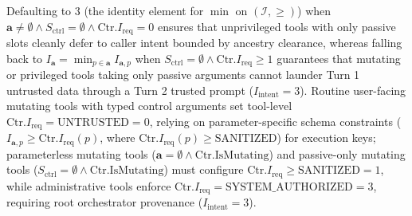 \documentclass[conference,10pt]{IEEEtran}
\begin{document}
Defaulting to $3$ (the identity element for $\min$ on $(\mathcal{I}, \ge)$) when $\mathbf{a} \ne \emptyset \land S_{\text{ctrl}} = \emptyset \land \text{Ctr}.I_{\text{req}} = 0$ ensures that unprivileged tools with only passive slots cleanly defer to caller intent bounded by ancestry clearance, whereas falling back to $I_{\mathbf{a}} = \min_{p \in \mathbf{a}} I_{\mathbf{a}, p}$ when $S_{\text{ctrl}} = \emptyset \land \text{Ctr}.I_{\text{req}} \ge 1$ guarantees that mutating or privileged tools taking only passive arguments cannot launder Turn 1 untrusted data through a Turn 2 trusted prompt ($I_{\text{intent}} = 3$). Routine user-facing mutating tools with typed control arguments set tool-level $\text{Ctr}.I_{\text{req}} = \text{UNTRUSTED} = 0$, relying on parameter-specific schema constraints ($I_{\mathbf{a}, p} \ge \text{Ctr}.I_{\text{req}}(p)$, where $\text{Ctr}.I_{\text{req}}(p) \ge \text{SANITIZED}$) for execution keys; parameterless mutating tools ($\mathbf{a} = \emptyset \land \text{Ctr.IsMutating}$) and passive-only mutating tools ($S_{\text{ctrl}} = \emptyset \land \text{Ctr.IsMutating}$) must configure $\text{Ctr}.I_{\text{req}} \ge \text{SANITIZED} = 1$, while administrative tools enforce $\text{Ctr}.I_{\text{req}} = \text{SYSTEM\_AUTHORIZED} = 3$, requiring root orchestrator provenance ($I_{\text{intent}} = 3$).
\end{document}
